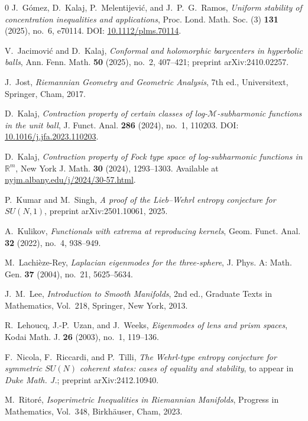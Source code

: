 \documentclass[11pt]{amsart}
\numberwithin{equation}{section}
\begin{document}
\begin{thebibliography}{0}
J.~G{\'o}mez, D.~Kalaj, P.~Melentijevi{\'c}, and J.~P.~G.~Ramos,
\emph{Uniform stability of concentration inequalities and applications},
Proc. Lond. Math. Soc. (3) \textbf{131} (2025), no.~6, e70114.
DOI: \href{https://doi.org/10.1112/plms.70114}{10.1112/plms.70114}.

V.~Jacimovi\'c and D.~Kalaj,
\emph{Conformal and holomorphic barycenters in hyperbolic balls},
Ann. Fenn. Math. \textbf{50} (2025), no.~2, 407--421;
preprint arXiv:2410.02257.

J.~Jost,
\emph{Riemannian Geometry and Geometric Analysis}, 7th ed.,
Universitext,
Springer, Cham, 2017.

D.~Kalaj,
\emph{Contraction property of certain classes of log-$\mathcal{M}$-subharmonic functions in the unit ball},
J. Funct. Anal. \textbf{286} (2024), no.~1, 110203.
DOI: \href{https://doi.org/10.1016/j.jfa.2023.110203}{10.1016/j.jfa.2023.110203}.

D.~Kalaj,
\emph{Contraction property of Fock type space of log-subharmonic functions in $\mathbb{R}^m$},
New York J. Math. \textbf{30} (2024), 1293--1303.
Available at \href{https://nyjm.albany.edu/j/2024/30-57.html}{nyjm.albany.edu/j/2024/30-57.html}.

P.~Kumar and M.~Singh,
\emph{A proof of the Lieb--Wehrl entropy conjecture for $SU(N,1)$},
preprint arXiv:2501.10061, 2025.

A.~Kulikov,
\emph{Functionals with extrema at reproducing kernels},
Geom. Funct. Anal. \textbf{32} (2022), no.~4, 938--949.

M.~Lachi\`{e}ze-Rey,
\emph{Laplacian eigenmodes for the three-sphere},
J. Phys. A: Math. Gen. \textbf{37} (2004), no.~21, 5625--5634.

J.~M.~Lee,
\emph{Introduction to Smooth Manifolds}, 2nd ed.,
Graduate Texts in Mathematics, Vol.~218,
Springer, New York, 2013.

R.~Lehoucq, J.-P.~Uzan, and J.~Weeks,
\emph{Eigenmodes of lens and prism spaces},
Kodai Math. J. \textbf{26} (2003), no.~1, 119--136.

F.~Nicola, F.~Riccardi, and P.~Tilli,
\emph{The Wehrl-type entropy conjecture for symmetric $SU(N)$ coherent states: cases of equality and stability},
to appear in \emph{Duke Math. J.};
preprint arXiv:2412.10940.

M.~Ritor\'e,
\emph{Isoperimetric Inequalities in Riemannian Manifolds},
Progress in Mathematics, Vol.~348,
Birkh\"auser, Cham, 2023.


\end{thebibliography}
\end{document}
